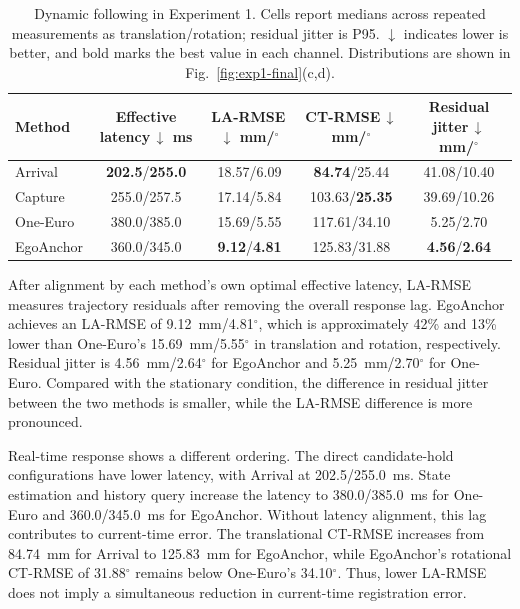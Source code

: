\documentclass[review]{vgtc}
\begin{document}
\begin{table}[t]
\centering
\caption{Dynamic following in Experiment 1. Cells report medians across repeated measurements as translation/rotation; residual jitter is P95. $\downarrow$ indicates lower is better, and bold marks the best value in each channel. Distributions are shown in Fig.~\ref{fig:exp1-final}(c,d).}
\setlength{\tabcolsep}{2pt}
\begin{tabular}{@{}lcccc@{}}
\toprule
Method & \shortstack{Effective\\latency\,$\downarrow$\\ms} & \shortstack{LA-RMSE\,$\downarrow$\\mm/$^\circ$} & \shortstack{CT-RMSE\,$\downarrow$\\mm/$^\circ$} & \shortstack{Residual\\jitter\,$\downarrow$\\mm/$^\circ$} \\
\midrule
Arrival & \textbf{202.5}/\textbf{255.0} & 18.57/6.09 & \textbf{84.74}/25.44 & 41.08/10.40 \\
Capture & 255.0/257.5 & 17.14/5.84 & 103.63/\textbf{25.35} & 39.69/10.26 \\
One-Euro & 380.0/385.0 & 15.69/5.55 & 117.61/34.10 & 5.25/2.70 \\
EgoAnchor & 360.0/345.0 & \textbf{9.12}/\textbf{4.81} & 125.83/31.88 & \textbf{4.56}/\textbf{2.64} \\
\bottomrule
\end{tabular}
\end{table}

After alignment by each method's own optimal effective latency, LA-RMSE measures trajectory residuals after removing the overall response lag. EgoAnchor achieves an LA-RMSE of 9.12~mm/4.81$^\circ$, which is approximately 42\% and 13\% lower than One-Euro's 15.69~mm/5.55$^\circ$ in translation and rotation, respectively. Residual jitter is 4.56~mm/2.64$^\circ$ for EgoAnchor and 5.25~mm/2.70$^\circ$ for One-Euro. Compared with the stationary condition, the difference in residual jitter between the two methods is smaller, while the LA-RMSE difference is more pronounced.

Real-time response shows a different ordering. The direct candidate-hold configurations have lower latency, with Arrival at 202.5/255.0~ms. State estimation and history query increase the latency to 380.0/385.0~ms for One-Euro and 360.0/345.0~ms for EgoAnchor. Without latency alignment, this lag contributes to current-time error. The translational CT-RMSE increases from 84.74~mm for Arrival to 125.83~mm for EgoAnchor, while EgoAnchor's rotational CT-RMSE of 31.88$^\circ$ remains below One-Euro's 34.10$^\circ$. Thus, lower LA-RMSE does not imply a simultaneous reduction in current-time registration error.
\end{document}
